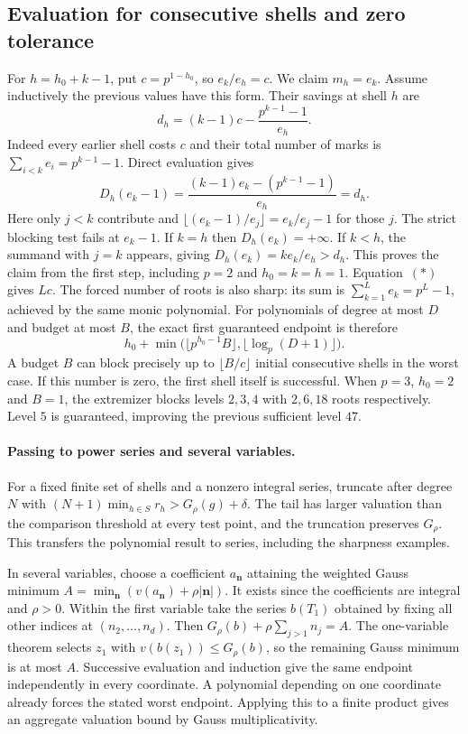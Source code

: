 \subsection{Evaluation for consecutive shells and zero tolerance}
For $h=h_0+k-1$, put $c=p^{1-h_0}$, so $e_k/e_h=c$. We claim
$m_h=e_k$. Assume inductively the previous values have this form.
Their savings at shell $h$ are
\[
   d_h=(k-1)c-\frac{p^{k-1}-1}{e_h}.
\]
Indeed every earlier shell costs $c$ and their total number of marks
is $\sum_{i<k}e_i=p^{k-1}-1$. Direct evaluation gives
\[
  D_h(e_k-1)=
       \frac{(k-1)e_k-(p^{k-1}-1)}{e_h}=d_h.
\]
Here only $j<k$ contribute and $\lfloor(e_k-1)/e_j\rfloor=e_k/e_j-1$
for those $j$. The strict blocking test fails at $e_k-1$. If $k=h$ then
$D_h(e_k)=+\infty$. If $k<h$, the summand with $j=k$ appears, giving
$D_h(e_k)=ke_k/e_h>d_h$. This proves the claim from the first step,
including $p=2$ and $h_0=k=h=1$. Equation~$(*)$ gives $Lc$.
The forced number of roots is also sharp: its sum is
$\sum_{k=1}^L e_k=p^L-1$, achieved by the same monic polynomial.
For polynomials of degree at most $D$ and budget at most $B$, the exact
first guaranteed endpoint is therefore
\[
 h_0+\min\bigl(\lfloor p^{h_0-1}B\rfloor,
                    \lfloor\log_p(D+1)\rfloor\bigr).
\]
A budget $B$ can block precisely up to $\lfloor B/c\rfloor$
initial consecutive shells in the worst case. If this number is zero,
the first shell itself is successful. When $p=3$, $h_0=2$ and $B=1$,
the extremizer blocks levels $2,3,4$ with $2,6,18$ roots respectively.
Level $5$ is guaranteed, improving the previous sufficient level $47$.

\paragraph{Passing to power series and several variables.}
For a fixed finite set of shells and a nonzero integral series, truncate
after degree $N$ with $(N+1)\min_{h\in S} r_h>G_\rho(g)+\delta$.
The tail has larger valuation than the comparison threshold at every
test point, and the truncation preserves $G_\rho$. This transfers the
polynomial result to series, including the sharpness examples.

In several variables, choose a coefficient $a_{\mathbf n}$ attaining the
weighted Gauss minimum $A=\min_{\mathbf n}(v(a_{\mathbf n})+\rho|\mathbf
n|)$. It exists since the coefficients are integral and $\rho>0$.
Within the first variable take the series $b(T_1)$ obtained by fixing all
other indices at $(n_2,\ldots,n_d)$. Then $G_\rho(b)+
\rho\sum_{j>1}n_j=A$. The one-variable theorem selects $z_1$ with
$v(b(z_1))\le G_\rho(b)$, so the remaining Gauss minimum is at most
$A$. Successive evaluation and induction give the same endpoint
independently in every coordinate. A polynomial depending on one
coordinate already forces the stated worst endpoint. Applying this to
a finite product gives an aggregate valuation bound by Gauss
multiplicativity.

